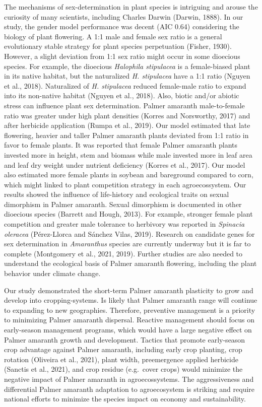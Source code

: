 \documentclass[utf8]{frontiersSCNS}
\begin{document}
The mechanisms of sex-determination in plant species is intriguing and
arouse the curiosity of many scientists, including Charles Darwin
(Darwin, 1888). In our study, the gender model performance was decent
(AIC 0.64) considering the biology of plant flowering. A 1:1 male and
female sex ratio is a general evolutionary stable strategy for plant
species perpetuation (Fisher, 1930). However, a slight deviation from
1:1 sex ratio might occur in some dioecious species. For example, the
dioecious \emph{Halophila stipulacea} is a female-biased plant in its
native habitat, but the naturalized \emph{H. stipulacea} have a 1:1
ratio (Nguyen et al., 2018). Naturalized of \emph{H. stipulacea} reduced
female-male ratio to expand into its non-native habitat (Nguyen et al.,
2018). Also, biotic and/or abiotic stress can influence plant sex
determination. Palmer amaranth male-to-female ratio was greater under
high plant densities (Korres and Norsworthy, 2017) and after herbicide
application (Rumpa et al., 2019). Our model estimated that late
flowering, heavier and taller Palmer amaranth plants deviated from 1:1
ratio in favor to female plants. It was reported that female Palmer
amaranth plants invested more in height, stem and biomass while male
invested more in leaf area and leaf dry weight under nutrient deficiency
(Korres et al., 2017). Our model also estimated more female plants in
soybean and bareground compared to corn, which might linked to plant
competition strategy in each agroecossystem. Our results showed the
influence of life-history and ecological traits on sexual dimorphism in
Palmer amaranth. Sexual dimorphism is documented in other dioecious
species (Barrett and Hough, 2013). For example, stronger female plant
competition and greater male tolerance to herbivory was reported in
\emph{Spinacia oleracea} (Pérez-Llorca and Sánchez Vilas, 2019).
Research on candidate genes for sex determination in \emph{Amaranthus}
species are currently underway but it is far to complete (Montgomery et
al., 2021, 2019). Further studies are also needed to understand the
ecological basis of Palmer amaranth flowering, including the plant
behavior under climate change.

Our study demonstrated the short-term Palmer amaranth plasticity to grow
and develop into cropping-systems. Is likely that Palmer amaranth range
will continue to expanding to new geographies. Therefore, preventive
management is a priority to minimizing Palmer amaranth dispersal.
Reactive management should focus on early-season management programs,
which would have a large negative effect on Palmer amaranth growth and
development. Tactics that promote early-season crop advantage against
Palmer amaranth, including early crop planting, crop rotation (Oliveira
et al., 2021), plant width, preemergence applied herbicide (Sanctis et
al., 2021), and crop residue (e.g.~cover crops) would minimize the
negative impact of Palmer amaranth in agroecossystems. The
aggressiveness and differential Palmer amaranth adaptation to
agroecosystem is striking and require national efforts to minimize the
species impact on economy and sustainability.
\end{document}
